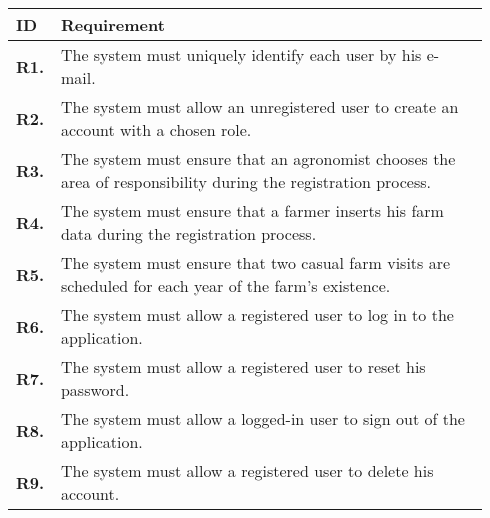 \begin{longtable}{@{}p{0.06\linewidth} p{0.88\linewidth}}
	\toprule
	\textbf{ID}   & \textbf{Requirement}\\
	\midrule
	
	\textbf{R1.} & The system must uniquely identify each user by his e-mail. \\
	\textbf{R2.} & The system must allow an unregistered user to create an account with a chosen role. \\
	\textbf{R3.} & The system must ensure that an agronomist chooses the area of responsibility during the registration process. \\
	\textbf{R4.} & The system must ensure that a farmer inserts his farm data during the registration process.\\
	\textbf{R5.} & The system must ensure that two casual farm visits are scheduled for each year of the farm's existence.\\
	\textbf{R6.} & The system must allow a registered user to log in to the application. \\
	\textbf{R7.} & The system must allow a registered user to reset his password. \\
	\textbf{R8.} & The system must allow a logged-in user to sign out of the application. \\
	\textbf{R9.} & The system must allow a registered user to delete his account. \\
	

\end{longtable}
